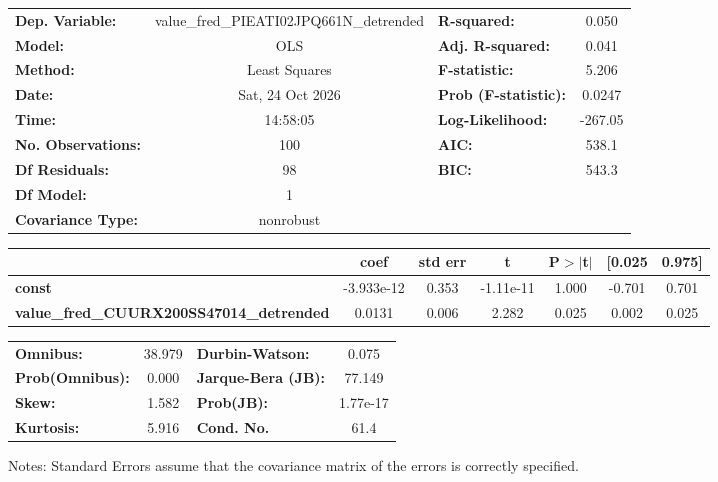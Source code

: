 \begin{center}
\begin{tabular}{lclc}
\toprule
\textbf{Dep. Variable:}                          & value\_fred\_PIEATI02JPQ661N\_detrended & \textbf{  R-squared:         } &     0.050   \\
\textbf{Model:}                                  &                   OLS                   & \textbf{  Adj. R-squared:    } &     0.041   \\
\textbf{Method:}                                 &              Least Squares              & \textbf{  F-statistic:       } &     5.206   \\
\textbf{Date:}                                   &             Sat, 24 Oct 2026            & \textbf{  Prob (F-statistic):} &   0.0247    \\
\textbf{Time:}                                   &                 14:58:05                & \textbf{  Log-Likelihood:    } &   -267.05   \\
\textbf{No. Observations:}                       &                     100                 & \textbf{  AIC:               } &     538.1   \\
\textbf{Df Residuals:}                           &                      98                 & \textbf{  BIC:               } &     543.3   \\
\textbf{Df Model:}                               &                       1                 & \textbf{                     } &             \\
\textbf{Covariance Type:}                        &                nonrobust                & \textbf{                     } &             \\
\bottomrule
\end{tabular}
\begin{tabular}{lcccccc}
                                                 & \textbf{coef} & \textbf{std err} & \textbf{t} & \textbf{P$> |$t$|$} & \textbf{[0.025} & \textbf{0.975]}  \\
\midrule
\textbf{const}                                   &   -3.933e-12  &        0.353     & -1.11e-11  &         1.000        &       -0.701    &        0.701     \\
\textbf{value\_fred\_CUURX200SS47014\_detrended} &       0.0131  &        0.006     &     2.282  &         0.025        &        0.002    &        0.025     \\
\bottomrule
\end{tabular}
\begin{tabular}{lclc}
\textbf{Omnibus:}       & 38.979 & \textbf{  Durbin-Watson:     } &    0.075  \\
\textbf{Prob(Omnibus):} &  0.000 & \textbf{  Jarque-Bera (JB):  } &   77.149  \\
\textbf{Skew:}          &  1.582 & \textbf{  Prob(JB):          } & 1.77e-17  \\
\textbf{Kurtosis:}      &  5.916 & \textbf{  Cond. No.          } &     61.4  \\
\bottomrule
\end{tabular}
\end{center}

Notes: \newline
 [1] Standard Errors assume that the covariance matrix of the errors is correctly specified.